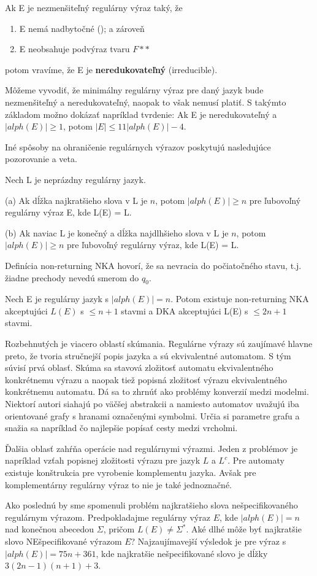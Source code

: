 \begin{df}
Ak E je nezmenšiteľný regulárny výraz taký, že
\begin{enumerate}
\item E nemá nadbytočné (); a zároveň
\item E neobsahuje podvýraz tvaru $F**$
\end{enumerate}
potom vravíme, že E je \textbf{neredukovateľný} (irreducible).
\end{df}

Môžeme vyvodiť, že minimálny regulárny výraz pre daný jazyk bude nezmenšiteľný a neredukovateľný, naopak to však nemusí platiť. S takýmto základom možno dokázať napríklad tvrdenie: Ak E je neredukovateľný a $|alph(E)| \geq 1$, potom $|E| \leq 11|alph(E)| - 4$.

Iné spôsoby na ohraničenie regulárnych výrazov poskytujú nasledujúce pozorovanie a veta.

\begin{veta}
Nech L je neprázdny regulárny jazyk.

(a) Ak dĺžka najkratšieho slova v L je $n$, potom $|alph(E)| \geq n$ pre ľubovoľný regulárny výraz E, kde L(E) = L.

(b) Ak naviac L je konečný a dĺžka najdlhšieho slova v L je $n$, potom $|alph(E)| \geq n$ pre ľubovoľný regulárny výraz, kde L(E) = L.
\end{veta}

Definícia non-returning NKA hovorí, že sa nevracia do počiatočného stavu, t.j. žiadne prechody nevedú smerom do $q_0$.

\begin{veta}[Theorem 10]
Nech E je regulárny jazyk s $|alph(E)| = n$. Potom existuje non-returning NKA akceptujúci $L(E)$ s $\leq n+1$ stavmi a DKA akceptujúci L(E) s $\leq 2n+1$ stavmi.
\end{veta}

Rozbehnutých je viacero oblastí skúmania. Regulárne výrazy sú zaujímavé hlavne preto, že tvoria stručnejší popis jazyka a sú ekvivalentné automatom. S tým súvisí prvá oblasť. Skúma sa stavová zložitosť automatu ekvivalentného konkrétnemu výrazu a naopak tiež popisná zložitosť výrazu ekvivalentného konkrétnemu automatu. Dá sa to zhrnúť ako problémy konverzií medzi modelmi. Niektorí autori siahajú po väčšej abstrakcii a namiesto automatov uvažujú iba orientované grafy s hranami označenými symbolmi. Určia si parametre grafu a snažia sa napríklad čo najlepšie popísať cesty medzi vrcholmi.

Ďalšia oblasť zahŕňa operácie nad regulárnymi výrazmi. Jeden z problémov je napríklad vzťah popisnej zložitosti výrazu pre jazyk $L$ a $L^c$. Pre automaty existuje konštrukcia pre vyrobenie komplementu jazyka. Avšak pre komplementárny regulárny výraz to nie je také jednoznačné.

Ako poslednú by sme spomenuli problém najkratšieho slova nešpecifikovaného re\-gu\-lár\-nym výrazom. Predpokladajme regulárny výraz $E$, kde $|alph(E)|=n$ nad konečnou abecedou $\Sigma$, pričom $L(E)\neq \Sigma^*$. Aké dlhé môže byť najkratšie slovo NEšpecifikované výrazom $E$? Najzaujímavejší výsledok je pre výraz s $|alph(E)| = 75n + 361$, kde naj\-krat\-šie nešpecifikované slovo je dĺžky $3(2 n - 1)(n + 1) + 3$.
